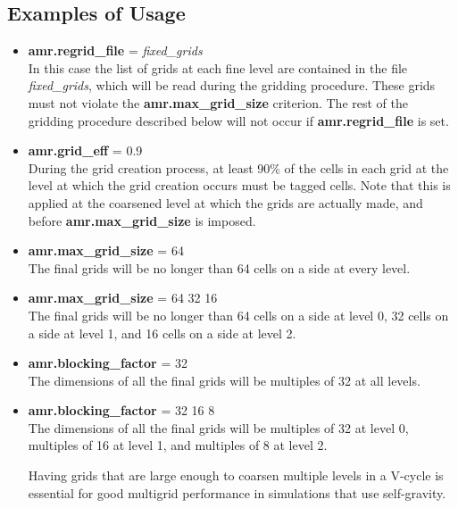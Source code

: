 \subsection{Examples of Usage}

\begin{itemize} 

\item {\bf amr.regrid\_file} = {\em fixed\_grids} \\ 
In this case the list of grids at each fine level are contained in the file {\em fixed\_grids},
which will be read during the gridding procedure.  These grids must not violate the
{\bf amr.max\_grid\_size} criterion.   The rest of the gridding procedure described below
will not occur if {\bf amr.regrid\_file} is set.

\item {\bf amr.grid\_eff} = 0.9\\ 
During the grid creation process, at least 90\% of the cells in each grid at the
level at which the grid creation occurs must be tagged cells.   Note that this is applied
at the coarsened level at which the grids are actually made, and before {\bf amr.max\_grid\_size}
is imposed.

\item {\bf amr.max\_grid\_size} = 64 \\ 
The final grids will be no longer than 64 cells on a side at every level.

\item {\bf amr.max\_grid\_size} = 64 32 16 \\ 
The final grids will be no longer than 64 cells on a side
at level 0, 32 cells on a side at level 1, and 16 cells on a side at level 2.

\item {\bf amr.blocking\_factor} = 32 \\
The dimensions of all the final grids will be multiples of 32 at all levels.

\item {\bf amr.blocking\_factor} = 32 16 8\\
The dimensions of all the final grids will be multiples of 32
at level 0, multiples of 16 at level 1, and multiples of 8 at level 2.

Having grids that are large enough to coarsen multiple levels in a V-cycle is essential
for good multigrid performance in simulations that use self-gravity.

\end{itemize}

